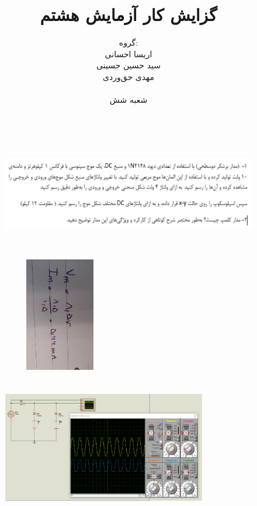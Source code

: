 \documentclass[12pt]{article}
\title{گزایش کار آزمایش هشتم}
\author{	گروه: \\	اریسا احسانی \\	سید حسین حسینی \\	مهدی حق‌وردی \\ \\	شعبه شش
}
\date{}
\begin{document}
\maketitle
\newpage

\begin{figure}[H]
\begin{center}
\includegraphics[width=\textwidth, height=5cm]{./images/8.1}
\end{center}
\end{figure}

\begin{figure}[H]
	\begin{flushleft}
		\includegraphics[width=5cm, height=5cm, angle=90]{./images/8.i.1}
	\end{flushleft}
\end{figure}

\begin{figure}[H]
	\begin{flushleft}
		\includegraphics[width=0.8\textwidth, height=6cm]{./images/8.2}
	\end{flushleft}
\end{figure}
\end{document}
